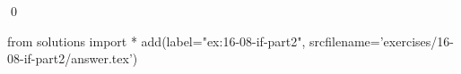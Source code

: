 
\begin{ex}
  \label{ex:16-08-if-part2}
  
  \qed
\end{ex}
\begin{python0}
from solutions import *
add(label="ex:16-08-if-part2",
    srcfilename='exercises/16-08-if-part2/answer.tex')
\end{python0}
